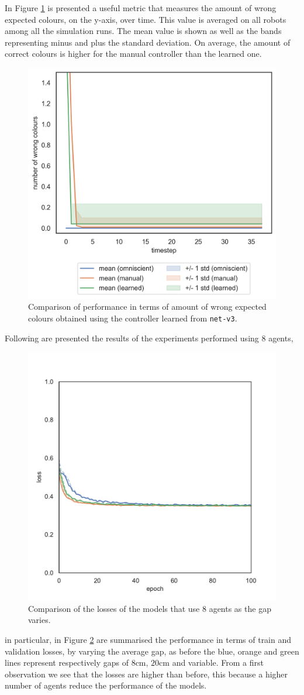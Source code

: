 In Figure \ref{fig:net-v3error} is presented a useful metric that measures the 
amount of wrong expected colours, on the y-axis, over time. This value is 
averaged on all robots among all the simulation runs. 
The mean value is shown as well as the bands representing minus and plus the 
standard deviation.
On average, the amount of correct colours is higher for the manual controller 
than the learned one. 
\begin{figure}[!htb]
	\centering
	\includegraphics[width=.5\textwidth]{contents/images/net-v3/colours-errors-compressed}%
	\caption[Evaluation of \texttt{net-v3} amount of wrong expected 
	colours.]{Comparison of performance in terms of amount of wrong expected 
	colours obtained using the controller learned from \texttt{net-v3}.}
	\label{fig:net-v3error}
\end{figure}

Following are presented the results of the experiments performed using $8$ 
agents, 
\begin{figure}[!htb]
	\centering
	\includegraphics[width=.4\textwidth]{contents/images/task2/loss-communication-N8}
	\caption{Comparison of the losses of the models that use $8$ agents as the gap 
		varies.}
	\label{fig:commlossn8t2}
\end{figure}
in particular, in Figure \ref{fig:commlossn8t2} are summarised the 
performance in terms of train and validation losses, by varying the average gap, as 
before the blue, orange and green lines represent respectively gaps of 
$8$\gls{cm}, $20$\gls{cm} and variable. 
From a first observation we see that the losses are higher than before, this 
because a higher number of agents reduce the performance of the models.

